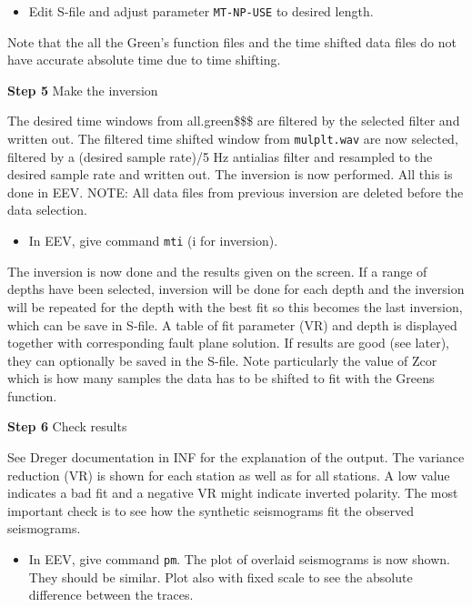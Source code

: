 \begin{itemize}
\item 
Edit S-file and adjust parameter \texttt{MT-NP-USE} to desired length.
\end{itemize}

Note that the all the Green's function files and the time shifted data files do not have accurate absolute time due to time shifting.

\textbf{Step 5}  Make the inversion

The desired time windows from all.green\$\$\$ are filtered by the selected filter and written out. The filtered time shifted window from \texttt{mulplt.wav} are now selected, filtered by a (desired sample rate)/5 Hz antialias filter and resampled to the desired sample rate and written out. The inversion is now performed. All this is done in EEV. NOTE: All data files from previous inversion are deleted before the data selection.

\begin{itemize}
\item 
In EEV, give command \texttt{mti} (i for inversion).
\end{itemize}

The inversion is now done and the results given on the screen. If a range of depths have been selected, inversion will be done for each depth and the inversion will be repeated for the depth with the best fit so this becomes the last inversion, which can be save in S-file. A table of fit parameter (VR) and depth is displayed together with corresponding fault plane solution. If results are good (see later), they can optionally be saved in the S-file. Note particularly the value of Zcor which is how many samples the data has to be shifted to fit with the Greens function.

\textbf{Step 6} Check results

See  Dreger documentation in INF for the explanation of the output. The variance reduction (VR) is shown for each station as well as for all stations. A low value indicates a bad fit and a negative VR might indicate inverted polarity. The most important check is to see how the synthetic seismograms fit the observed seismograms.

\begin{itemize}
\item 
In EEV, give command \texttt{pm}. The plot of overlaid seismograms is now shown. They should be similar. Plot also with fixed scale to see the absolute difference between the traces.
\end{itemize}

